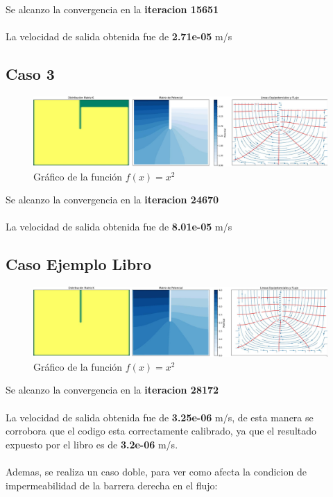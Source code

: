 Se alcanzo la convergencia en la \textbf{iteracion 15651}
\\ \\
La velocidad de salida obtenida fue de \textbf{2.71e-05} m/s

\subsection{Caso 3}

\begin{figure}[H]
    \centering
    \includegraphics[width=1\textwidth]{GRAFICOS/laplace_caso_3.jpg}
    \caption{Gráfico de la función $f(x) = x^2$}
    \label{fig:caso_3}
\end{figure}

Se alcanzo la convergencia en la \textbf{iteracion 24670}
\\ \\
La velocidad de salida obtenida fue de \textbf{8.01e-05} m/s

\subsection{Caso Ejemplo Libro}

\begin{figure}[H]
    \centering
    \includegraphics[width=1\textwidth]{GRAFICOS/laplace_caso_ejemplo.jpg}
    \caption{Gráfico de la función $f(x) = x^2$}
    \label{fig:caso_ejemplo}
\end{figure}

Se alcanzo la convergencia en la \textbf{iteracion 28172}
\\ \\
La velocidad de salida obtenida fue de \textbf{3.25e-06} m/s, de esta manera se corrobora que el codigo esta correctamente calibrado, ya que el resultado expuesto por el libro es de \textbf{3.2e-06} m/s.
\\ \\
Ademas, se realiza un caso doble, para ver como afecta la condicion de impermeabilidad de la barrera derecha en el flujo:

